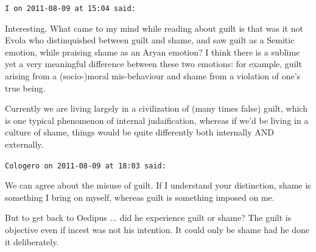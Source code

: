 \begin{footnotesize}
\begin{sffamily}
\hfill

\texttt{I on 2011-08-09 at 15:04 said:}

Interesting. What came to my mind while reading about guilt is that was it not Evola who distinquished between guilt and shame, and saw guilt as a Semitic emotion, while praising shame as an Aryan emotion? I think there is a sublime yet a very meaningful difference between these two emotions: for example, guilt arising from a (socio-)moral mis-behaviour and shame from a violation of one's true being.

Currently we are living largely in a civilization of (many times false) guilt, which is one typical phenomenon of internal judaification, whereas if we'd be living in a culture of shame, things would be quite differently both internally AND externally.

\hfill

\texttt{Cologero on 2011-08-09 at 18:03 said:}

We can agree about the misuse of guilt. If I understand your distinction, shame is something I bring on myself, whereas guilt is something imposed on me.

But to get back to Oedipus ... did he experience guilt or shame? The guilt is objective even if incest was not his intention. It could only be shame had he done it deliberately.


\hfill

\end{sffamily}
\end{footnotesize}

